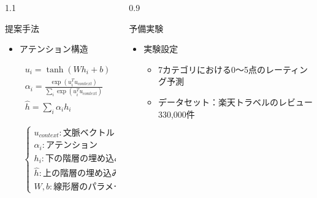 \documentclass[unicode,10pt]{beamer}
\newlength{\mycolumnwidth}
\newcommand{\itemtitle}[1]{#1\\}
\begin{document}
\begin{frame}[t]
\begin{columns}[onlytextwidth,t]
\begin{column}{1.1\mycolumnwidth}
\begin{block}{提案手法}
\begin{figure}
      \end{figure}
      \begin{itemize}
        \item アテンション構造 \cite{yang16}
          {
            \large
            \hspace{-8em} %
            \begin{minipage}[t]{0.4\linewidth}
              \begin{gather*}
                u_i = \tanh (W h_{i} + b) \\
                \alpha_i = \frac{\exp (u^T_i u_{context})}
                                {\sum_i \exp (u^T_i u_{context})} \\
                \hat{h} = \sum_i \alpha_i h_i
              \end{gather*}
            \end{minipage}
            \begin{minipage}[t]{0.1\linewidth}
              \begin{gather*}
                \begin{cases}
                  u_{context} : \text{文脈ベクトル} \\
                  \alpha_i : \text{アテンション} \\
                  h_i : \text{下の階層の埋め込み} \\
                  \hat{h} : \text{上の階層の埋め込み} \\
                  W, b : \text{線形層のパラメータ}
                \end{cases}
              \end{gather*}
            \end{minipage}
          }
      \end{itemize}
    \end{block}
  \end{column}

  \begin{column}{0.9\mycolumnwidth}
    \begin{block}{予備実験}
      \begin{itemize}
        \item \itemtitle{実験設定}
          \begin{itemize}
            \item 7カテゴリにおける0〜5点のレーティング予測
            \item データセット：楽天トラベルのレビュー330,000件
          \end{itemize}
      \end{itemize}


\end{block}
\end{column}
\end{columns}
\end{frame}
\end{document}
